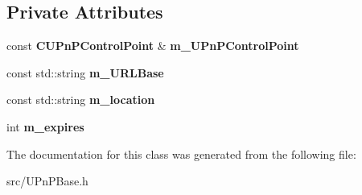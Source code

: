 \subsection*{Private Attributes}
\begin{DoxyCompactItemize}
\item 
const {\bf CUPnPControlPoint} \& {\bfseries m\_\-UPnPControlPoint}\label{classCUPnPRootDevice_a5a3787c2370ff2f8ceccfb422c95c940}

\item 
const std::string {\bfseries m\_\-URLBase}\label{classCUPnPRootDevice_afbf26b8fa495dd8ccbc99c85c9295d31}

\item 
const std::string {\bfseries m\_\-location}\label{classCUPnPRootDevice_a864b3d900c2b2f15182fa8564ab0b215}

\item 
int {\bfseries m\_\-expires}\label{classCUPnPRootDevice_a66d4b1e921d58ca5f0e12516448efb3c}

\end{DoxyCompactItemize}


The documentation for this class was generated from the following file:\begin{DoxyCompactItemize}
\item 
src/UPnPBase.h\end{DoxyCompactItemize}
